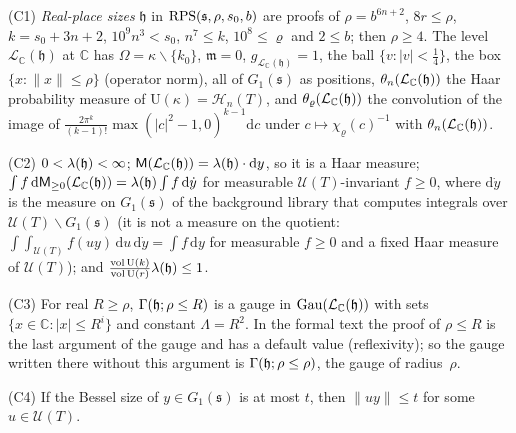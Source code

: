 \documentclass[11pt,a4paper]{article}
\theoremstyle{plainx}
\theoremstyle{uprightx}
\newcommand{\CC}{\mathbb{C}}
\newcommand{\dd}{\mathrm{d}}
\newcommand{\Hl}[2]{\mathcal{H}_{#1}(#2)}
\newcommand{\UT}[1]{\mathcal{U}(#1)}
\newcommand{\gL}[1]{g_{#1}}
\newcommand{\vol}{\operatorname{vol}}
\newcommand{\cLC}[1]{\mathcal{L}_{\CC}(#1)}
\newcommand{\Gone}[1]{G_1(#1)}
\newcommand{\volU}[1]{\vol\mathrm{U}(#1)}
\newcommand{\boost}[2]{\chi_{#1}(#2)}
\newcommand{\Inp}[1]{\textup{(#1)}}
\begin{document}
\Inp{C1} \emph{Real-place sizes} $\mathfrak{h}$ in $\operatorname{RPS}(\mathfrak{s},\rho,s_0,b)$ are proofs of
$\rho=b^{6n+2}$, $8r\le\rho$, $k=s_0+3n+2$, $10^{9}n^{3}<s_0$, $n^{7}\le k$, $10^{8}\le\varrho$ and $2\le b$; then
$\rho\ge4$. The level $\cLC{\mathfrak{h}}$ at $\CC$ has $\Omega=\kappa\smallsetminus\{k_0\}$, $\mathfrak{m}=0$,
$\gL{\cLC{\mathfrak{h}}}=1$, the ball $\{v:|v|<\tfrac14\}$, the box $\{x:\|x\|\le\rho\}$ (operator norm), all of
$\Gone{\mathfrak{s}}$ as positions, $\floorMeasure{\cLC{\mathfrak{h}}}{n}$ the Haar probability measure of
$\mathrm{U}(\kappa)=\Hl{n}{T}$, and $\floorMeasure{\cLC{\mathfrak{h}}}{\varrho}$ the convolution of the image of
$\frac{2\pi^{k}}{(k-1)!}\max(|c|^{2}-1,0)^{k-1}\dd c$ under $c\mapsto\boost{\varrho}{c}^{-1}$ with
$\floorMeasure{\cLC{\mathfrak{h}}}{n}$.

\Inp{C2} $0<\lambda(\mathfrak{h})<\infty$; $\groupMeasure{\cLC{\mathfrak{h}}}=\haarRatio{\mathfrak{h}}\cdot\dd y$,
so it is a Haar measure; $\int f\,\dd\upperMeasure{\cLC{\mathfrak{h}}}{0}=\haarRatio{\mathfrak{h}}\int f\,\dd\dot y$ for
measurable $\UT{T}$-invariant $f\ge0$, where $\dd\dot y$ is the measure on $\Gone{\mathfrak{s}}$ of the background
library that computes integrals over $\UT{T}\backslash\Gone{\mathfrak{s}}$ (it is not a measure on the quotient:
$\int\!\!\int_{\UT{T}}f(uy)\,\dd u\,\dd\dot y=\int f\,\dd y$ for measurable $f\ge0$ and a fixed Haar measure of
$\UT{T}$); and $\frac{\volU{k}}{\volU{r}}\haarRatio{\mathfrak{h}}\le1$.

\Inp{C3} For real $R\ge\rho$, $\Gamma(\mathfrak{h};\rho\le R)$ is a gauge in $\Gauges{\cLC{\mathfrak{h}}}$ with sets
$\{x\in\CC:|x|\le R^{i}\}$ and constant $\Lambda=R^{2}$. In the formal text the proof of $\rho\le R$ is the last
argument of the gauge and has a default value (reflexivity); so the gauge written there without this argument is
$\Gamma(\mathfrak{h};\rho\le\rho)$, the gauge of radius~$\rho$.

\Inp{C4} If the Bessel size of $y\in\Gone{\mathfrak{s}}$ is at most $t$, then $\|uy\|\le t$ for some $u\in\UT{T}$.
\end{document}
